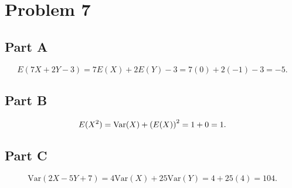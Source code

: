 \documentclass[12pt]{extarticle}
\begin{document}
\section*{Problem 7}
\subsection*{Part A}
\[
	E(7X + 2Y - 3) = 7E(X) + 2E(Y) - 3 = 7(0) + 2(-1) - 3 = -5
.\]
\subsection*{Part B}
\[
	E(X^2) = \text{Var}(X) + \qty(E(X))^2 = 1 + 0 = 1
.\]

\subsection*{Part C}
\[
	\text{Var}(2X - 5Y + 7) = 4 \text{Var}(X) + 25 \text{Var}(Y) = 4 + 25(4) = 104
.\]
\end{document}
